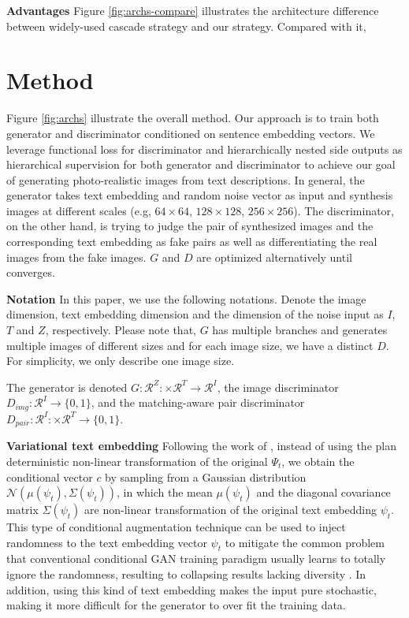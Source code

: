 \documentclass[10pt,twocolumn,letterpaper]{article}
\begin{document}
\textbf{Advantages} Figure \ref{fig:archs-compare} illustrates the architecture difference between widely-used cascade strategy \cite{han2017stackgan,denton2015deep} and our strategy. Compared with it, 
\\

\section{Method}
Figure \ref{fig:archs} illustrate the overall method.
Our approach is to train both generator and discriminator conditioned on sentence embedding vectors. We leverage functional loss for discriminator and hierarchically nested side outputs as hierarchical supervision for both generator and discriminator to achieve our goal of generating photo-realistic images from text descriptions.  In general, the generator takes text embedding and random noise vector as input and synthesis images at different scales (e.g, $64\times64$, $128\times128$, $256\times256$). The discriminator, on the other hand, is trying to judge the pair of synthesized images and the corresponding text embedding as fake pairs as well as differentiating the real images from the fake images. $G$ and $D$ are optimized alternatively until converges.


\textbf{Notation } In this paper, we use the following notations. Denote the image dimension, text embedding dimension and the dimension of the noise input as $I$, $T$ and $Z$, respectively. Please note that, $G$ has multiple branches and generates multiple images of different sizes and for each image size, we have a distinct $D$. For simplicity, we only describe one image size.  

The generator is denoted $G: \mathcal{R}^{Z}: \times \mathcal{R}^{T}\rightarrow\mathcal{R}^{I}$, the image discriminator $D_{img}: \mathcal{R}^{I}\rightarrow\{0, 1\}$, and the matching-aware pair discriminator $D_{pair}: \mathcal{R}^{I}: \times \mathcal{R}^{T}\rightarrow\{0, 1\}$. 


\textbf{Variational text embedding } Following the work of \cite{han2017stackgan}, instead of using the plan deterministic non-linear transformation of the original $\Psi_t$, we obtain the conditional vector $c$ by sampling from a Gaussian distribution $\mathcal{N}(\mu(\psi_t), \Sigma(\psi_t) )$, in which the mean $\mu(\psi_t)$ and the diagonal covariance matrix $\Sigma(\psi_t)$ are non-linear transformation of the original text embedding $\psi_t$. This type of conditional augmentation technique can be used to inject randomness to the text embedding vector $\psi_t$ to mitigate the common problem that conventional conditional GAN training paradigm usually learns to totally ignore the randomness, resulting to collapsing results lacking diversity \cite{reed2016generative}. In addition, using this kind of text embedding makes the input pure stochastic, making it more difficult for the generator to over fit the training data.
\end{document}
